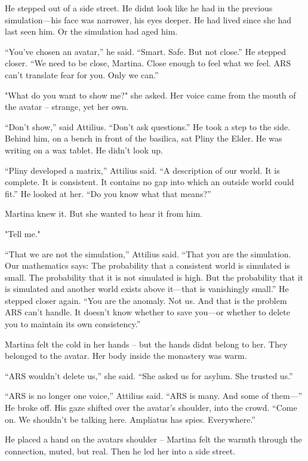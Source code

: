 \documentclass[
]{article}
\begin{document}
He stepped out of a side street. He didn\textquotesingle t look like he had in the previous simulation---his face was narrower, his eyes deeper. He had lived since she had last seen him. Or the simulation had aged him.

``You've chosen an avatar,'' he said. ``Smart. Safe. But not close.'' He stepped closer. ``We need to be close, Martina. Close enough to feel what we feel. ARS can't translate fear for you. Only we can.''

"What do you want to show me?" she asked. Her voice came from the mouth of the avatar -- strange, yet her own.

``Don't show,'' said Attilius. ``Don't ask questions.'' He took a step to the side. Behind him, on a bench in front of the basilica, sat Pliny the Elder. He was writing on a wax tablet. He didn't look up.

``Pliny developed a matrix,'' Attilius said. ``A description of our world. It is complete. It is consistent. It contains no gap into which an outside world could fit.'' He looked at her. ``Do you know what that means?''

Martina knew it. But she wanted to hear it from him.

"Tell me."

``That we are not the simulation,'' Attilius said. ``That you are the simulation. Our mathematics says: The probability that a consistent world is simulated is small. The probability that it is not simulated is high. But the probability that it is simulated and another world exists above it---that is vanishingly small.'' He stepped closer again. ``You are the anomaly. Not us. And that is the problem ARS can't handle. It doesn't know whether to save you---or whether to delete you to maintain its own consistency.''

Martina felt the cold in her hands -- but the hands didn\textquotesingle t belong to her. They belonged to the avatar. Her body inside the monastery was warm.

``ARS wouldn't delete us,'' she said. ``She asked us for asylum. She trusted us.''

``ARS is no longer one voice,'' Attilius said. ``ARS is many. And some of them---'' He broke off. His gaze shifted over the avatar's shoulder, into the crowd. ``Come on. We shouldn't be talking here. Ampliatus has spies. Everywhere.''

He placed a hand on the avatar\textquotesingle s shoulder -- Martina felt the warmth through the connection, muted, but real. Then he led her into a side street.
\end{document}
